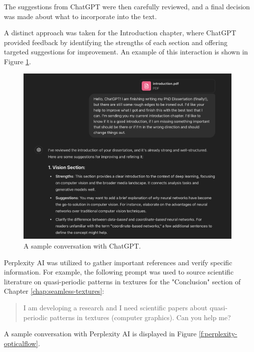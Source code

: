 The suggestions from ChatGPT were then carefully reviewed, and a final decision was made about what to incorporate into the text.

A distinct approach was taken for the Introduction chapter, where ChatGPT provided feedback by identifying the strengths of each section and offering targeted suggestions for improvement. An example of this interaction is shown in Figure \ref{f:chatgpt-introduction}.

\begin{figure}[!ht]
    \centering
    \includegraphics[width=0.80\linewidth]{img/ch7/gpt-intro.png}
    \caption{A sample conversation with ChatGPT.} 
    \label{f:chatgpt-introduction}
 \end{figure}

Perplexity AI was utilized to gather important references and verify specific information. For example, the following prompt was used to source scientific literature on quasi-periodic patterns in textures for the "Conclusion" section of Chapter \ref{chap:seamless-textures}:

\begin{quotation}
    I am developing a research and I need scientific papers about quasi-periodic patterns in textures (computer graphics). Can you help me?
\end{quotation}

A sample conversation with Perplexity AI is displayed in Figure \ref{f:perplexity-opticalflow}.

